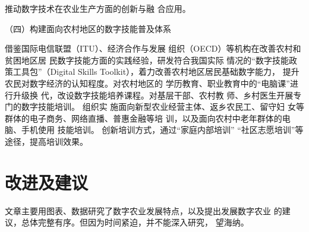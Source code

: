 \documentclass[a4paper]{article}
\begin{document}
推动数字技术在农业生产方面的创新与融
合应用。
\par
{\fangsong （四）构建面向农村地区的数字技能普及体系}
\par
借鉴国际电信联盟（ITU）、经济合作与发展
组织（OECD）等机构在改善农村和贫困地区居
民数字技能方面的实践经验，研发符合我国实际
情况的“数字技能政策工具包”（Digital Skills
Toolkit），着力改善农村地区居民基础数字能力，
提升农民对数字经济的认知程度。对农村地区的
学历教育、职业教育中的“电脑课”进行升级换
代，改设数字技能培养课程。对基层干部、农村教
师、乡村医生开展专门的数字技能培训。 组织实
施面向新型农业经营主体、返乡农民工、留守妇
女等群体的电子商务、网络直播、普惠金融等培
训，以及面向农村中老年群体的电脑、手机使用
技能培训。 创新培训方式，通过“家庭内部培训”
“社区志愿培训”等途径，提高培训效果。
\section{改进及建议}
文章主要用图表、数据研究了数字农业发展特点，以及提出发展数字农业
的建议，总体完整有序。但因为时间紧迫，并不能深入研究，
望海纳。
\newpage
\begin{center}
\end{center}
\end{document}
